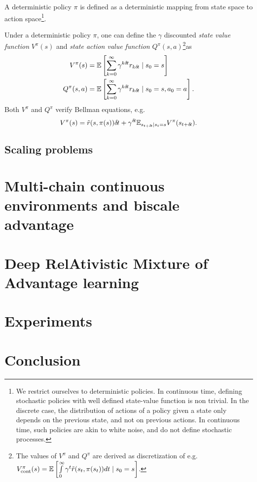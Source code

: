 \documentclass{article}
\begin{document}
A deterministic policy $\pi$ is defined as a deterministic mapping from state
space to action space\footnote{We restrict ourselves to deterministic policies.
	In continuous time, defining stochastic policies with well defined
	state-value function is non trivial. In the discrete case, the
distribution of actions of a policy given a state only depends on the previous
state, and not on previous actions. In continuous time, such policies are akin
to white noise, and do not define stochastic processes.}.

Under a deterministic policy $\pi$, one can define the $\gamma$ discounted
\emph{state value function} $V^\pi(s)$ and \emph{state action value function}
$Q^\pi(s, a)$\footnote{
	The values of $V^\pi$ and $Q^\pi$ are derived as discretization of e.g.
	$V^\pi_\text{cont}(s) = \mathbb{E}\left[\int\limits_0^\infty \gamma^t \tilde{r}(s_t, \pi(s_t)) dt \mid s_0 = s\right]$.
}as
\begin{align}
	V^\pi(s) &= \mathbb{E}\left[
		\sum\limits_{k=0}^\infty \gamma^{k\delta\hspace{-.1em}t}
		r_{k \delta\hspace{-.1em}t} \mid s_0 = s
	\right]\\
	Q^\pi(s, a) &= \mathbb{E}\left[
		\sum\limits_{k=0}^\infty \gamma^{k\delta\hspace{-.1em}t}
		r_{k \delta\hspace{-.1em}t} \mid s_0 = s, a_0 = a
	\right].
\end{align}
Both $V^\pi$ and $Q^\pi$ verify Bellman equations, e.g.
\begin{align}
	V^\pi(s) = \tilde{r}(s, \pi(s)) \delta\hspace{-.1em}t + \gamma^{\delta\hspace{-.1em}t} \mathbb{E}_{s_{t+\delta\hspace{-.1em}t}\mid s_t=s} V^\pi(s_{t+\delta\hspace{-.1em}t}).
\end{align}

\subsection{Scaling problems}


\section{Multi-chain continuous environments and biscale advantage}
\label{sec:multi-chain}

\section{Deep RelAtivistic Mixture of Advantage learning}
\label{sec:algo}

\section{Experiments}
\label{sec:exp}

\section{Conclusion}
\label{sec:concl}



\end{document}
